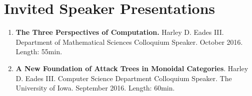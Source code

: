 \documentclass[11pt]{article}
\begin{document}
      
      
      
      
      

      

  \section{Invited Speaker Presentations}
    \label{subsec:invited_speaker}
    \begin{enumerate}
    \item[] \textbf{The Three Perspectives of Computation.} Harley
      D. Eades III. Department of Mathematical Sciences Colloquium
      Speaker. October 2016. Length: 55min.
      
    \item[] \textbf{A New Foundation of Attack Trees in Monoidal
      Categories}. Harley D. Eades III. Computer Science Department
      Colloquium Speaker.  The University of Iowa. September
      2016. Length: 60min.      
    \end{enumerate}
    
\end{document}
